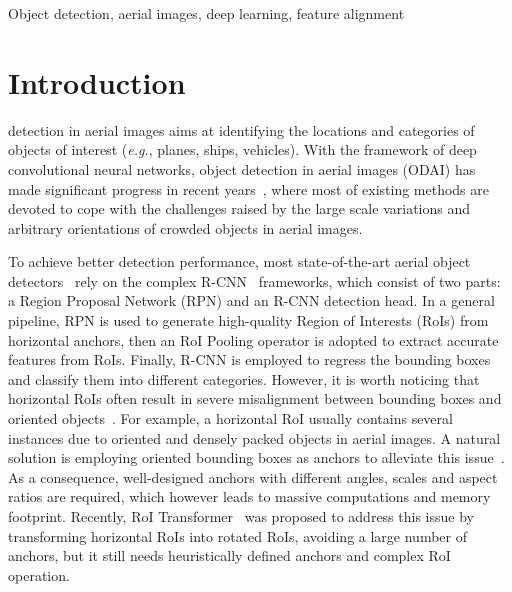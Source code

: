 \documentclass[10pt,journal,final]{IEEEtran}
\def\eg{{\em e.g.}}
\begin{document}
\begin{IEEEkeywords}
Object detection, aerial images, deep learning, feature alignment
\end{IEEEkeywords}

\section{Introduction}
\label{sec:intro}
 detection in aerial images aims at identifying the locations and categories of objects of interest (\eg, planes, ships, vehicles). With the framework of deep convolutional neural networks, object detection in aerial images (ODAI) has made significant progress in recent years~\cite{cheng2016ricnn,liu2016ship,xia2018dota,ding2018transformer,zhang2019cad,wang2020centermap,xu2019gliding}, where most of existing methods are devoted to cope with the challenges raised by the large scale variations and arbitrary orientations of crowded objects in aerial images.

To achieve better detection performance, most state-of-the-art aerial object detectors~\cite{ding2018transformer, zhang2019cad, yang2019scrdet, xu2019gliding} rely on the complex R-CNN~\cite{girshick2014rich} frameworks, which consist of two parts: a Region Proposal Network (RPN) and an R-CNN detection head. 
In a general pipeline, RPN is used to generate high-quality Region of Interests (RoIs) from horizontal anchors, then an RoI Pooling operator is adopted to extract accurate features from RoIs. Finally, R-CNN is employed to regress the bounding boxes and classify them into different categories. 
However, it is worth noticing that horizontal RoIs often result in severe misalignment between bounding boxes and oriented objects~\cite{ding2018transformer,xia2018dota}. For example, a horizontal RoI usually contains several instances due to oriented and densely packed objects in aerial images. 
A natural solution is employing oriented bounding boxes as anchors to alleviate this issue~\cite{liu2016ship, xia2018dota}. As a consequence, well-designed anchors with different angles, scales and aspect ratios are required, which however leads to massive computations and memory footprint. 
Recently, RoI Transformer~\cite{ding2018transformer} was proposed to address this issue by transforming horizontal RoIs into rotated RoIs, avoiding a large number of anchors, but it still needs heuristically defined anchors and complex RoI operation.
\end{document}
